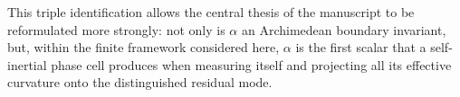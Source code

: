 This triple identification allows the central thesis of the manuscript to be reformulated more strongly:
not only is $\alpha$ an Archimedean boundary invariant, but, within the finite framework
considered here, $\alpha$ is the first scalar that a self-inertial phase cell produces when
measuring itself and projecting all its effective curvature onto the distinguished residual mode.
